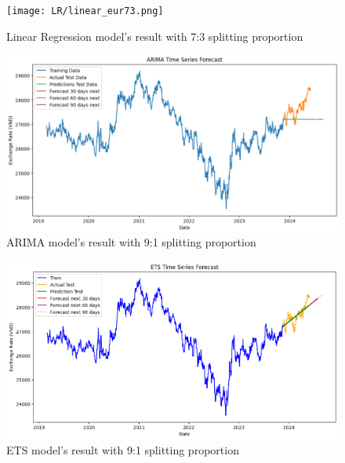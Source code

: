 \documentclass{ieeeojies}
\begin{document}
\begin{figure}[H]
  \centering
  \begin{minipage}{0.8\linewidth}
    \centering
    \texttt{[image: LR/linear\_eur73.png]}
    \caption{Linear Regression model's result with 7:3 splitting proportion}
    \label{fig10}
  \end{minipage}
\end{figure}
\begin{figure}[H]
  \centering
  \begin{minipage}{0.8\linewidth}
    \centering
    \includegraphics[width=\linewidth]{ARIMA/arima_eur_91.png}
    \caption{ARIMA model's result with 9:1 splitting proportion}
    \label{fig11}
  \end{minipage}
\end{figure}
\begin{figure}[H]
  \centering
  \begin{minipage}{0.8\linewidth}
    \centering
    \includegraphics[width=\linewidth]{ETS/ETS_eur_91.png}
    \caption{ETS model's result with 9:1 splitting proportion}
    \label{fig12}
  \end{minipage}
\end{figure}
\end{document}
